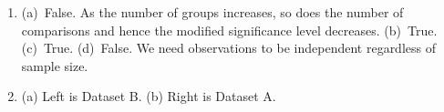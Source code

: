 \documentclass[
  10pt,
  openany]{book}
\begin{document}
\begin{enumerate}
  \addtocounter{enumi}{1}
\item
  (a)~False. As the number of groups increases, so does the number of comparisons and hence the modified significance level decreases. (b)~True. (c)~True. (d)~False. We need observations to be independent regardless of sample size.

  \addtocounter{enumi}{1}
\item
  (a) Left is Dataset B. (b) Right is Dataset A.

  \addtocounter{enumi}{1}
\end{enumerate}

  
\end{document}
